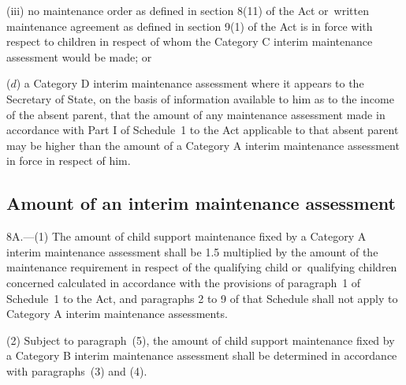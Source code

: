\documentclass[a4paper,12pt]{article}
\begin{document}
\begin{enumerate}
\begin{enumerate}
(iii) no maintenance order as defined in section 8(11) of the Act or~written maintenance agreement as defined in section 9(1) of the Act is in force with respect to children in respect of whom the Category C interim maintenance assessment would be made; or
\end{enumerate}

($d$) a Category D interim maintenance assessment where it appears to 
the Secretary of State,  %
on the basis of information available to him as to the income of the absent parent, that the amount of any maintenance assessment made in accordance with Part I of Schedule~1 to the Act applicable to that absent parent may be higher than the amount of a Category A interim maintenance assessment in force in respect of him.
\end{enumerate}



\subsection[8A. Amount of an interim maintenance assessment]{Amount of an interim maintenance assessment}

8A.—(1) The amount of child support maintenance fixed by a Category A interim maintenance assessment shall be 1$.$5 multiplied by the amount of the maintenance requirement in respect of the qualifying child or~qualifying children concerned calculated in accordance with the provisions of paragraph~1 of Schedule~1 to the Act, and paragraphs 2 to 9 of that Schedule shall not apply to Category A interim maintenance assessments.

(2) Subject to paragraph~(5), the amount of child support maintenance fixed by a Category B interim maintenance assessment shall be determined in accordance with paragraphs~(3) and (4).
\end{document}
